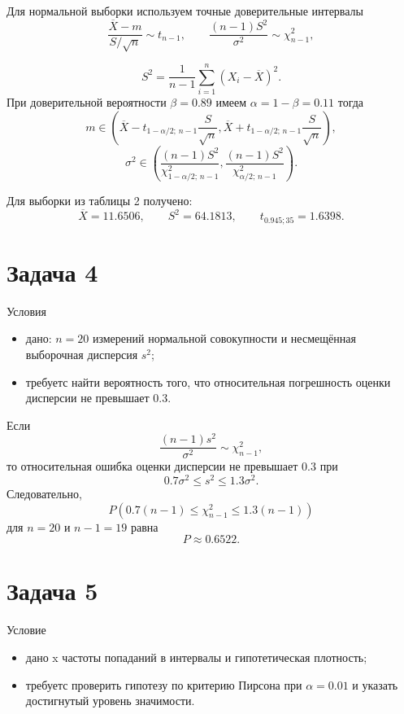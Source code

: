 \documentclass[a4paper,14pt]{extarticle}
\begin{document}
Для нормальной выборки используем точные доверительные интервалы
\[
\frac{\overline{X}-m}{S/\sqrt{n}} \sim t_{n-1},
\qquad
\frac{(n-1)S^2}{\sigma^2}\sim \chi^2_{n-1},
\]

\[
S^2=\frac{1}{n-1}\sum_{i=1}^{n}(X_i-\overline{X})^2.
\]
При доверительной вероятности \(\beta=0.89\) имеем \(\alpha=1-\beta=0.11\)
тогда
\[
m \in \left(
\overline{X}-t_{1-\alpha/2;\,n-1}\frac{S}{\sqrt{n}},
\overline{X}+t_{1-\alpha/2;\,n-1}\frac{S}{\sqrt{n}}
\right),
\] 
\[
\sigma^2 \in \left(
\frac{(n-1)S^2}{\chi^2_{1-\alpha/2;\,n-1}},
\frac{(n-1)S^2}{\chi^2_{\alpha/2;\,n-1}}
\right).
\]

Для выборки из таблицы 2 получено:
\[
\overline{X}=11.6506,\qquad S^2=64.1813,\qquad t_{0.945;35}=1.6398.
\]



\section{Задача 4}

Условия
\begin{itemize}
    \item дано: \(n=20\) измерений нормальной совокупности и несмещённая выборочная дисперсия \(s^2\);
    \item требуетс найти вероятность того, что относительная погрешность оценки дисперсии не превышает \(0.3\).
\end{itemize}

Если
\[
\frac{(n-1)s^2}{\sigma^2}\sim\chi^2_{n-1},
\]
то относительная ошибка оценки дисперсии не превышает \(0.3\) при
\[
0.7\sigma^2 \le s^2 \le 1.3\sigma^2.
\]
Следовательно,
\[
P\left(0.7(n-1)\le \chi^2_{n-1}\le 1.3(n-1)\right)
\]
для \(n=20\) и \(n-1=19\) равна
\[
P \approx 0.6522.
\]



\section{Задача 5}

Условие
\begin{itemize}
    \item дано x частоты попаданий в интервалы и гипотетическая плотность;
    \item требуетс  проверить гипотезу по критерию Пирсона при \(\alpha=0.01\) и указать достигнутый уровень значимости.
\end{itemize}
\end{document}
